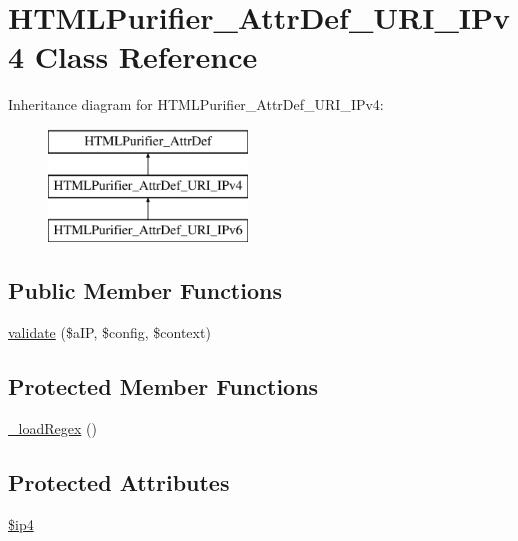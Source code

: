\hypertarget{classHTMLPurifier__AttrDef__URI__IPv4}{\section{H\+T\+M\+L\+Purifier\+\_\+\+Attr\+Def\+\_\+\+U\+R\+I\+\_\+\+I\+Pv4 Class Reference}
\label{classHTMLPurifier__AttrDef__URI__IPv4}
}
Inheritance diagram for H\+T\+M\+L\+Purifier\+\_\+\+Attr\+Def\+\_\+\+U\+R\+I\+\_\+\+I\+Pv4\+:\begin{figure}[H]
\begin{center}
\leavevmode
\includegraphics[height=3.000000cm]{classHTMLPurifier__AttrDef__URI__IPv4}
\end{center}
\end{figure}
\subsection*{Public Member Functions}
\begin{DoxyCompactItemize}
\item 
\hyperlink{classHTMLPurifier__AttrDef__URI__IPv4_a28a583f0503d93efd25c586e2a8f24eb}{validate} (\$a\+I\+P, \$config, \$context)
\end{DoxyCompactItemize}
\subsection*{Protected Member Functions}
\begin{DoxyCompactItemize}
\item 
\hyperlink{classHTMLPurifier__AttrDef__URI__IPv4_a9d4a917558654621905fda1f61563159}{\+\_\+load\+Regex} ()
\end{DoxyCompactItemize}
\subsection*{Protected Attributes}
\begin{DoxyCompactItemize}
\item 
\hyperlink{classHTMLPurifier__AttrDef__URI__IPv4_a2b5e3f2b6f6e41bdf2d48309379f5de1}{\$ip4}
\end{DoxyCompactItemize}
